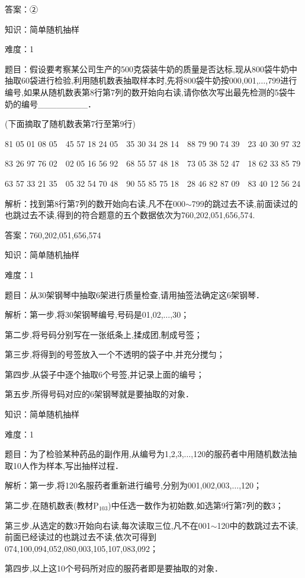 \documentclass{article} %
\begin{document}
答案：②

知识：简单随机抽样

难度：1

题目：假设要考察某公司生产的500克袋装牛奶的质量是否达标,现从800袋牛奶中抽取60袋进行检验,利用随机数表抽取样本时,先将800袋牛奶按000,001,$\dots$,799进行编号,如果从随机数表第8行第7列的数开始向右读,请你依次写出最先检测的5袋牛奶的编号\_\_\_\_\_\_\_\_．

(下面摘取了随机数表第7行至第9行)

81 05 01 08 05　45 57 18 24 05　35 30 34 28 14　88 79 90 74 39　23 40 30 97 32

83 26 97 76 02　02 05 16 56 92　68 55 57 48 18　73 05 38 52 47　18 62 33 85 79

63 57 33 21 35　05 32 54 70 48　90 55 85 75 18　28 46 82 87 09　83 40 12 56 24

解析：找到第8行第7列的数开始向右读,凡不在000$\sim$799的跳过去不读,前面读过的也跳过去不读,得到的符合题意的五个数据依次为760,202,051,656,574.

答案：760,202,051,656,574

知识：简单随机抽样

难度：1

题目：从30架钢琴中抽取6架进行质量检查,请用抽签法确定这6架钢琴．

解析：第一步,将30架钢琴编号,号码是01,02,$\dots$,30；

第二步,将号码分别写在一张纸条上,揉成团,制成号签；

第三步,将得到的号签放入一个不透明的袋子中,并充分搅匀；

第四步,从袋子中逐个抽取6个号签,并记录上面的编号；

第五步,所得号码对应的6架钢琴就是要抽取的对象．

知识：简单随机抽样

难度：1

题目：为了检验某种药品的副作用,从编号为1,2,3,$\dots$,120的服药者中用随机数法抽取10人作为样本,写出抽样过程．

解析：第一步,将120名服药者重新进行编号,分别为001,002,003,$\dots$,120；

第二步,在随机数表(教材P${}_{103}$)中任选一数作为初始数,如选第9行第7列的数3；

第三步,从选定的数3开始向右读,每次读取三位,凡不在001$\sim$120中的数跳过去不读,前面已经读过的也跳过去不读,依次可得到074,100,094,052,080,003,105,107,083,092；

第四步,以上这10个号码所对应的服药者即是要抽取的对象．
\end{document}
